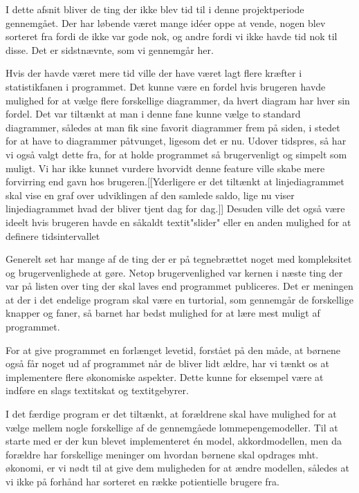 I dette afsnit bliver de ting der ikke blev tid til i denne projektperiode gennemgået. Der har løbende været mange idéer oppe at vende, nogen blev sorteret fra fordi de ikke var gode nok, og andre fordi vi ikke havde tid nok til disse. Det er sidstnævnte, som vi gennemgår her.

Hvis der havde været mere tid ville der have været lagt flere kræfter i statistikfanen i programmet. Det kunne være en fordel hvis brugeren havde mulighed for at vælge flere forskellige diagrammer, da hvert diagram har hver sin fordel. Det var tiltænkt at man i denne fane kunne vælge to standard diagrammer, således at man fik sine favorit diagrammer frem på siden, i stedet for at have to diagrammer påtvunget, ligesom det er nu. Udover tidspres, så har vi også valgt dette fra, for at holde programmet så brugervenligt og simpelt som muligt. Vi har ikke kunnet vurdere hvorvidt denne feature ville skabe mere forvirring end gavn hos brugeren.[[Yderligere er det tiltænkt at linjediagrammet skal vise en graf over udviklingen af den samlede saldo, lige nu viser linjediagrammet hvad der bliver tjent dag for dag.]] Desuden ville det også være ideelt hvis brugeren havde en såkaldt textit{"slider"} eller en anden mulighed for at definere tidsintervallet

Generelt set har mange af de ting der er på tegnebrættet noget med kompleksitet og brugervenlighede at gøre. 
Netop brugervenlighed var kernen i næste ting der var på listen over ting der skal laves end programmet publiceres. Det er meningen at der i det endelige program skal være en turtorial, som gennemgår de forskellige knapper og faner, så barnet har bedst mulighed for at lære mest muligt af programmet. 

For at give programmet en forlænget levetid, forstået på den måde, at børnene også får noget ud af programmet når de bliver lidt ældre, har vi tænkt os at implementere flere økonomiske aspekter. Dette kunne for eksempel være at indføre en slags textit{skat} og textit{gebyrer}. 

I det færdige program er det tiltænkt, at forældrene skal have mulighed for at vælge mellem nogle forskellige af de gennemgåede lommepengemodeller. Til at starte med er der kun blevet implementeret én model, akkordmodellen, men da forældre har forskellige meninger om hvordan børnene skal opdrages mht. økonomi, er vi nødt til at give dem muligheden for at ændre modellen, således at vi ikke på forhånd har sorteret en række potientielle brugere fra.




